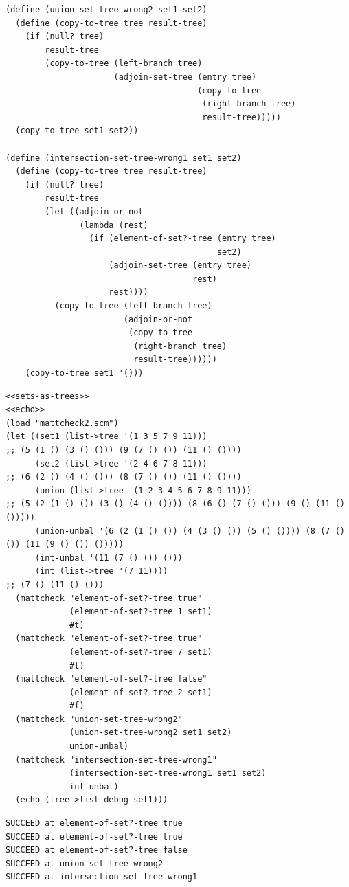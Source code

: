 \documentclass[final,fleqn,titlepage,twoside]{article}
\begin{document}
\begin{verbatim}
(define (union-set-tree-wrong2 set1 set2)
  (define (copy-to-tree tree result-tree)
    (if (null? tree)
        result-tree
        (copy-to-tree (left-branch tree)
                      (adjoin-set-tree (entry tree)
                                       (copy-to-tree
                                        (right-branch tree)
                                        result-tree)))))
  (copy-to-tree set1 set2))

(define (intersection-set-tree-wrong1 set1 set2)
  (define (copy-to-tree tree result-tree)
    (if (null? tree)
        result-tree
        (let ((adjoin-or-not
               (lambda (rest)
                 (if (element-of-set?-tree (entry tree)
                                           set2)
                     (adjoin-set-tree (entry tree)
                                      rest)
                     rest))))
          (copy-to-tree (left-branch tree)
                        (adjoin-or-not
                         (copy-to-tree
                          (right-branch tree)
                          result-tree))))))
    (copy-to-tree set1 '()))
\end{verbatim}

\begin{verbatim}
<<sets-as-trees>>
<<echo>>
(load "mattcheck2.scm")
(let ((set1 (list->tree '(1 3 5 7 9 11)))
;; (5 (1 () (3 () ())) (9 (7 () ()) (11 () ())))
      (set2 (list->tree '(2 4 6 7 8 11)))
;; (6 (2 () (4 () ())) (8 (7 () ()) (11 () ())))
      (union (list->tree '(1 2 3 4 5 6 7 8 9 11)))
;; (5 (2 (1 () ()) (3 () (4 () ()))) (8 (6 () (7 () ())) (9 () (11 () ()))))
      (union-unbal '(6 (2 (1 () ()) (4 (3 () ()) (5 () ()))) (8 (7 () ()) (11 (9 () ()) ()))))
      (int-unbal '(11 (7 () ()) ()))
      (int (list->tree '(7 11))))
;; (7 () (11 () ()))
  (mattcheck "element-of-set?-tree true"
             (element-of-set?-tree 1 set1)
             #t)
  (mattcheck "element-of-set?-tree true"
             (element-of-set?-tree 7 set1)
             #t)
  (mattcheck "element-of-set?-tree false"
             (element-of-set?-tree 2 set1)
             #f)
  (mattcheck "union-set-tree-wrong2"
             (union-set-tree-wrong2 set1 set2)
             union-unbal)
  (mattcheck "intersection-set-tree-wrong1"
             (intersection-set-tree-wrong1 set1 set2)
             int-unbal)
  (echo (tree->list-debug set1)))
\end{verbatim}

\begin{verbatim}
SUCCEED at element-of-set?-tree true
SUCCEED at element-of-set?-tree true
SUCCEED at element-of-set?-tree false
SUCCEED at union-set-tree-wrong2
SUCCEED at intersection-set-tree-wrong1
\end{verbatim}
\end{document}
